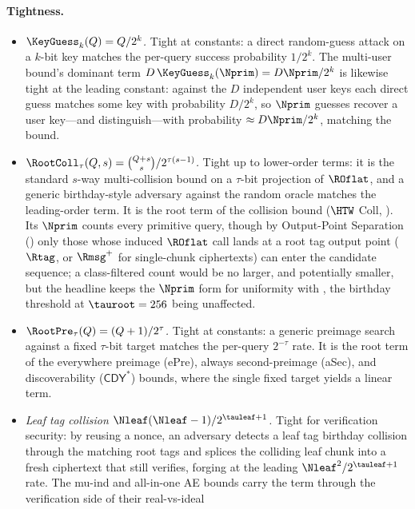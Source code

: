 \paragraph{Tightness.}
\begin{itemize}
\item \emph{$\KeyGuess_k(Q) = Q / 2^k$.} Tight at constants: a direct
  random-guess attack on a $k$-bit key matches the per-query success
  probability $1 / 2^k$. The multi-user bound's dominant term
  $D\,\KeyGuess_k(\Nprim) = D\Nprim / 2^k$ is likewise tight at the
  leading constant: against the $D$ independent user keys each direct
  guess matches some key with probability $D / 2^k$, so $\Nprim$ guesses
  recover a user key---and distinguish---with probability
  $\approx D\Nprim / 2^k$, matching the bound.
\item \emph{$\RootColl_\tau(Q, s) = \binom{Q + s}{s} / 2^{\tau (s -
  1)}$.} Tight up to lower-order terms: it is the standard $s$-way
  multi-collision bound on a $\tau$-bit projection of $\ROflat$, and
  a generic birthday-style adversary against the random oracle
  matches the leading-order term. It is the root term of the collision
  bound ($\HTW$ Coll, ). Its $\Nprim$ counts every
  primitive query, though by Output-Point Separation
  () only those whose induced $\ROflat$ call lands at
  a root tag output point ($\Rtag$, or $\Rmsg^+$ for single-chunk
  ciphertexts) can enter the candidate sequence; a class-filtered count
  would be no larger, and potentially smaller, but the headline keeps the
  $\Nprim$ form for uniformity with , the birthday
  threshold at $\tauroot = 256$ being unaffected.
\item \emph{$\RootPre_\tau(Q) = (Q + 1) / 2^\tau$.} Tight at constants: a
  generic preimage search against a fixed $\tau$-bit target matches the
  per-query $2^{-\tau}$ rate. It is the root term of the everywhere
  preimage (ePre), always second-preimage (aSec), and discoverability
  ($\mathsf{CDY}^\ast$) bounds, where the
  single fixed target yields a linear term.
\item \emph{Leaf tag collision $\Nleaf (\Nleaf - 1) / 2^{\tauleaf +
  1}$.} Tight for verification security: by reusing
  a nonce, an adversary detects a leaf tag birthday collision through the
  matching root tags and splices the colliding leaf chunk into a fresh
  ciphertext that still verifies, forging at the leading
  $\Nleaf^2 / 2^{\tauleaf + 1}$ rate. The mu-ind and all-in-one AE bounds
  carry the term through the verification side of their real-vs-ideal

\end{itemize}
